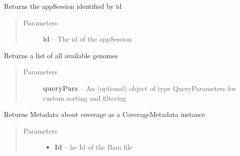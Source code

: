 \documentclass[letterpaper,10pt,english]{sphinxmanual}
\begin{document}
\begin{fulllineitems}
\begin{fulllineitems}
\end{fulllineitems}


\begin{fulllineitems}
\label{Available modules:BaseSpacePy.api.BaseSpaceAPI.BaseSpaceAPI.getAppSessionById}
Returns the appSession identified by id
\begin{quote}\begin{description}
\item[{Parameters}] \leavevmode
\textbf{id} -- The id of the appSession

\end{description}\end{quote}

\end{fulllineitems}


\begin{fulllineitems}
\label{Available modules:BaseSpacePy.api.BaseSpaceAPI.BaseSpaceAPI.getAvailableGenomes}
Returns a list of all available genomes
\begin{quote}\begin{description}
\item[{Parameters}] \leavevmode
\textbf{queryPars} -- An (optional) object of type QueryParameters for custom sorting and filtering

\end{description}\end{quote}

\end{fulllineitems}


\begin{fulllineitems}
\label{Available modules:BaseSpacePy.api.BaseSpaceAPI.BaseSpaceAPI.getCoverageMetaInfo}
Returns Metadata about coverage as a CoverageMetadata instance
\begin{quote}\begin{description}
\item[{Parameters}] \leavevmode\begin{itemize}
\item {} 
\textbf{Id} -- he Id of the Bam file


\end{itemize}
\end{description}
\end{quote}
\end{fulllineitems}
\end{fulllineitems}
\end{document}
